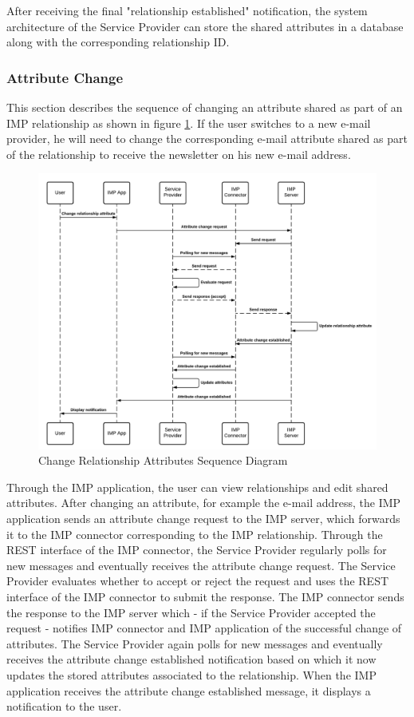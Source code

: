 After receiving the final "relationship established" notification, the system architecture of the Service Provider can store the shared attributes in a database along with the corresponding relationship ID.

\subsubsection{Attribute Change}
This section describes the sequence of changing an attribute shared as part of an IMP relationship as shown in figure \ref{imp:attribute_change}. If the user switches to a new e-mail provider, he will need to change the corresponding e-mail attribute shared as part of the relationship to receive the newsletter on his new e-mail address.

\begin{figure}[h!]
    \centering
    \includegraphics[scale=0.6]{Diagrams/IMP Use Case Change Realtionship Attribute Sequence Diagram.pdf}
    \caption{Change Relationship Attributes Sequence Diagram}
    \label{imp:attribute_change}
\end{figure}

Through the IMP application, the user can view relationships and edit shared attributes. After changing an attribute, for example the e-mail address, the IMP application sends an attribute change request to the IMP server, which forwards it to the IMP connector corresponding to the IMP relationship. Through the REST interface of the IMP connector, the Service Provider regularly polls for new messages and eventually receives the attribute change request. The Service Provider evaluates whether to accept or reject the request and uses the REST interface of the IMP connector to submit the response. The IMP connector sends the response to the IMP server which - if the Service Provider accepted the request - notifies IMP connector and IMP application of the successful change of attributes. The Service Provider again polls for new messages and eventually receives the attribute change established notification based on which it now updates the stored attributes associated to the relationship. When the IMP application receives the attribute change established message, it displays a notification to the user.

